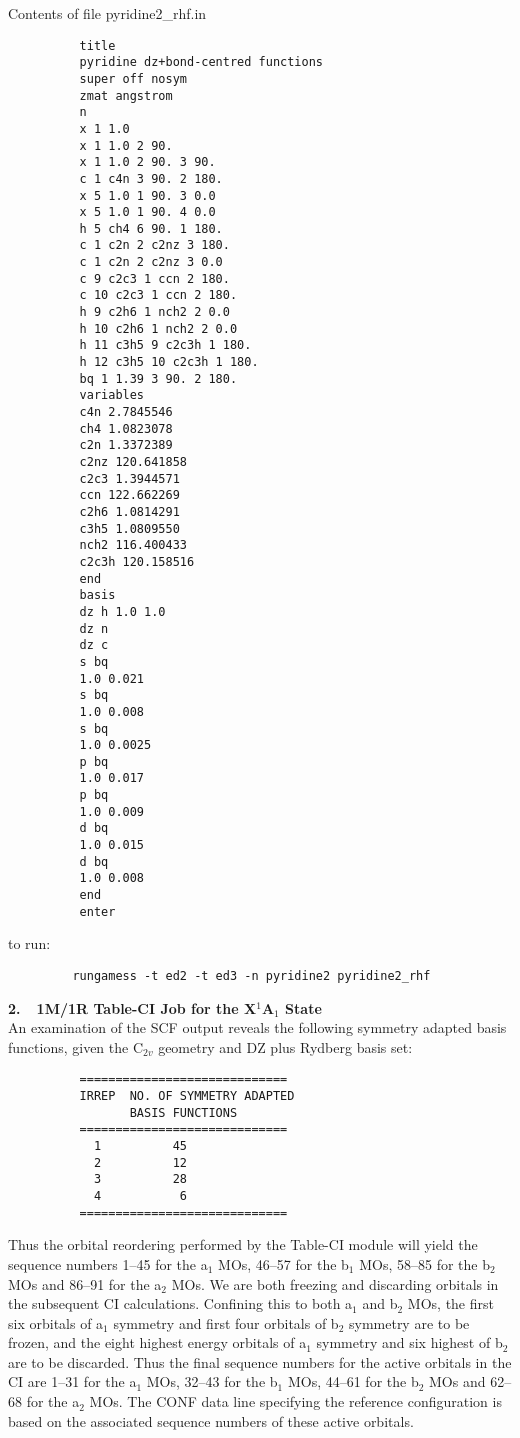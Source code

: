\documentclass[11pt,fleqn]{article}
\begin{document}
Contents of file pyridine2\_rhf.in
{
\footnotesize
\begin{verbatim}
          title
          pyridine dz+bond-centred functions
          super off nosym
          zmat angstrom
          n
          x 1 1.0
          x 1 1.0 2 90.
          x 1 1.0 2 90. 3 90.
          c 1 c4n 3 90. 2 180.
          x 5 1.0 1 90. 3 0.0
          x 5 1.0 1 90. 4 0.0
          h 5 ch4 6 90. 1 180.
          c 1 c2n 2 c2nz 3 180.
          c 1 c2n 2 c2nz 3 0.0
          c 9 c2c3 1 ccn 2 180.
          c 10 c2c3 1 ccn 2 180.
          h 9 c2h6 1 nch2 2 0.0
          h 10 c2h6 1 nch2 2 0.0
          h 11 c3h5 9 c2c3h 1 180.
          h 12 c3h5 10 c2c3h 1 180.
          bq 1 1.39 3 90. 2 180.
          variables
          c4n 2.7845546
          ch4 1.0823078
          c2n 1.3372389
          c2nz 120.641858
          c2c3 1.3944571
          ccn 122.662269
          c2h6 1.0814291
          c3h5 1.0809550
          nch2 116.400433
          c2c3h 120.158516
          end
          basis
          dz h 1.0 1.0
          dz n
          dz c
          s bq
          1.0 0.021
          s bq
          1.0 0.008
          s bq
          1.0 0.0025
          p bq
          1.0 0.017
          p bq
          1.0 0.009
          d bq
          1.0 0.015
          d bq
          1.0 0.008
          end
          enter
\end{verbatim}
}
to run:
{
\footnotesize
\begin{verbatim}
         rungamess -t ed2 -t ed3 -n pyridine2 pyridine2_rhf
\end{verbatim}
}
{\bf 2.~~1M/1R Table-CI Job for the X$^{1}$A$_{1}$ State}\\

An examination of the SCF output reveals the following symmetry adapted
basis functions,  
given the C$_{2v}$ geometry and DZ plus Rydberg basis set:
{
\footnotesize
\begin{verbatim}
          =============================
          IRREP  NO. OF SYMMETRY ADAPTED
                 BASIS FUNCTIONS
          =============================
            1          45
            2          12
            3          28
            4           6
          =============================
\end{verbatim}
}
Thus the orbital reordering performed by the Table-CI module
will yield the sequence numbers 1--45 for the a$_{1}$ MOs,
46--57 for the b$_{1}$ MOs, 58--85 for the b$_{2}$ MOs and 
86--91 for the a$_{2}$ MOs. We are both freezing and discarding
orbitals in the subsequent CI calculations. Confining this to
both a$_{1}$ and b$_{2}$ MOs, the first six orbitals of a$_{1}$ 
symmetry and first four orbitals of b$_{2}$ symmetry are to be frozen, 
and the eight highest energy orbitals of a$_{1}$ symmetry 
and six highest of b$_{2}$ are to be discarded.
Thus the final sequence numbers for the active 
orbitals in the CI are 1--31 for the a$_{1}$ MOs,
32--43 for the b$_{1}$ MOs, 44--61 for the b$_{2}$ MOs and 
62--68 for the a$_{2}$ MOs.  The CONF data line specifying
the reference configuration is based on the associated
sequence numbers of these active orbitals.
\end{document}
